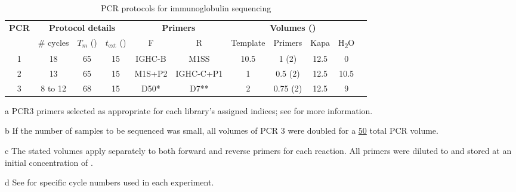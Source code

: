 \begin{table}[h]
\def\arraystretch{1.3}
\centering\small
\begin{threeparttable}
\caption{PCR protocols for \Nfu immunoglobulin sequencing}
\begin{tabular}{c|ccc|cc|ccccc}\toprule
\multirow{2}{*}{\textbf{PCR}} & \multicolumn{3}{c|}{\textbf{Protocol details}} & \multicolumn{2}{c|}{\textbf{Primers}} & \multicolumn{4}{c}{\textbf{Volumes (\ul{})\tnote{b}}}\\
 & \# cycles & $T_m$ (\degC{}) & $t_\mathrm{ext}$ (\secs{}) & F & R & Template & Primers\tnote{c} & Kapa & H\textsubscript{2}O \\\midrule
1 & 18 & 65 & 15 & IGHC-B & M1SS & 10.5 & 1 (\x{}2) & 12.5 & 0 \\\midrule
2 & 13 & 65 & 15 & M1S+P2 & IGHC-C+P1 & 1 & 0.5 (\x{}2) & 12.5 & 10.5 \\\midrule
3 & 8 to 12\tnote{d} & 68 & 15 & D50*\tnote{a} & D7**\tnote{a} & 2 & 0.75 (\x{}2) & 12.5 & 9 \\
\bottomrule
\end{tabular}
\begin{tablenotes}
\item[a] PCR3 primers selected as appropriate for each library's assigned indices; see  for more information.
\item[b] If the number of samples to be sequenced was small, all volumes of PCR 3 were doubled for a \ul{50} total PCR volume.
\item[c] The stated volumes apply separately to both forward and reverse primers for each reaction. All primers were diluted to and stored at an initial concentration of .
\item[d] See  for specific cycle numbers used in each experiment.
\end{tablenotes}
\label{tab:methods_igseq_pcr}
\end{threeparttable}
\end{table}

